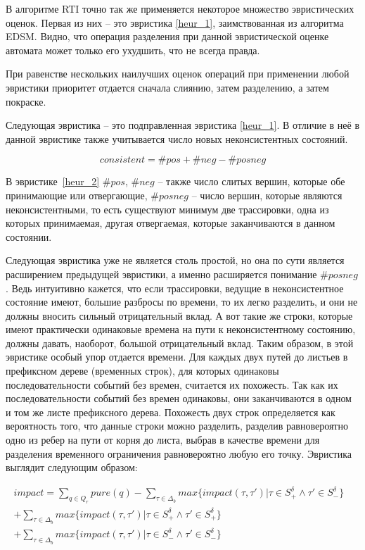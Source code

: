 \documentclass[times,specification,annotation]{itmo-student-thesis}
\begin{document}
В алгоритме RTI точно так же применяется некоторое множество эвристических оценок. Первая из них -- это эвристика \ref{heur_1}, заимствованная из алгоритма EDSM. 
Видно, что операция разделения при данной эвристической оценке автомата может только его ухудшить, что не всегда правда. 

При равенстве нескольких наилучших оценок операций при применении любой эвристики приоритет отдается сначала слиянию, затем разделению, а затем покраске.

Следующая эвристика -- это подправленная эвристика \ref{heur_1}. В отличие в неё в данной эвристике также учитывается число новых неконсистентных состояний.

\begin{equation}
  consistent = \#pos + \#neg - \#posneg
  \label{heur_2}
\end{equation}

В эвристике~\ref{heur_2} $\#pos$, $\#neg$ -- также число слитых вершин, которые обе принимающие или отвергающие, $\#posneg$ -- число вершин, которые являются неконсистентными, то есть
существуют минимум две трассировки, одна из которых принимаемая, другая отвергаемая, которые заканчиваются в данном состоянии.

Следующая эвристика уже не является столь простой, но она по сути является расширением предыдущей эвристики, а именно расширяется понимание $\#posneg$. Ведь интуитивно кажется, что
если трассировки, ведущие в неконсистентное состояние имеют, большие разбросы по времени, то их легко разделить, и они не должны вносить сильный отрицательный вклад. А вот такие же строки,
которые имеют практически одинаковые времена на пути к неконсистентному состоянию, должны давать, наоборот, большой отрицательный вклад.
Таким образом, в этой эвристике особый упор отдается времени. Для каждых двух путей до листьев в префиксном дереве (временных строк), 
для которых одинаковы последовательности событий без времен, считается их похожесть. Так как их последовательности событий без времен одинаковы, они заканчиваются в одном и том же листе 
префиксного дерева. Похожесть двух строк определяется как вероятность того, что данные строки можно разделить, разделив равновероятно одно из ребер на пути от корня до листа, выбрав в качестве
времени для разделения временного ограничения равновероятно любую его точку. Эвристика выглядит следующим образом:

\begin{equation}
  \begin{split}
    impact = \mathop{\sum}\limits_{q \in Q_r}pure(q) - \mathop{\sum}\limits_{\tau \in \Delta_b}max\{impact(\tau, \tau') | \tau \in S^\delta_+ \land \tau' \in S^\delta_-\}& \\
						     + \mathop{\sum}\limits_{\tau \in \Delta_b}max\{impact(\tau, \tau') | \tau \in S^\delta_+ \land \tau' \in S^\delta_+\}& \\ 
						     + \mathop{\sum}\limits_{\tau \in \Delta_b}max\{impact(\tau, \tau') | \tau \in S^\delta_- \land \tau' \in S^\delta_-\}&
  \end{split}
  \label{heur_3}
\end{equation}
\end{document}
